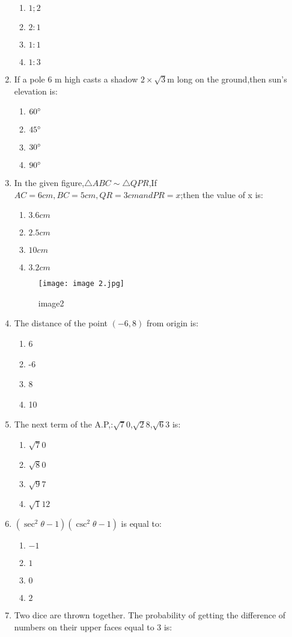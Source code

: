 \documentclass{article}
\begin{document}
\begin{enumerate}
	\begin{enumerate}
	\item $1;2$
	\item $2:1$
	\item $1:1$
	\item $1:3$
\end{enumerate}
\item If a pole 6 m high casts a shadow $2 \times \sqrt{3}$m long on the ground,then sun's elevation is:
	\begin{enumerate}
	\item $60\degree$
	\item $45\degree$
	\item $30\degree$
	\item $90\degree$
	\end{enumerate}
\item In the given figure,$\triangle ABC \sim \triangle QPR$,If $AC = 6 cm,BC = 5 cm,QR = 3 cm and PR = x$;then the value of  x is:
	\begin{enumerate}
	\item $3.6 cm$
	\item $2.5 cm$
	\item $10 cm$
	\item $3.2 cm$
	\end{enumerate}
	\begin{figure}[!ht]
\centering
\texttt{[image: image 2.jpg]}
\label{fig:image1}
	\caption{image2}
\end{figure}
\item The distance of the point $(-6,8)$ from origin is:
	\begin{enumerate}
	\item 6
	\item -6
	\item 8
	\item 10
\end{enumerate}
\item The next term of the A.P,:$\sqrt 70$,$\sqrt 28$,$\sqrt 63$ is:
	\begin{enumerate}
        \item $\sqrt 70$
	\item $\sqrt 80$
	\item $\sqrt 97$
	\item $\sqrt 112$
\end{enumerate}
\item $(\sec^2 \theta - 1)(\csc^2 \theta - 1)$
is equal to:
\begin{enumerate}
	\item $-1$
	\item $1$
	\item $0$
	\item $2$
\end{enumerate}
\item  Two dice are thrown together. The probability of getting the difference of numbers on their upper faces equal to 3 is:


\end{enumerate}
\end{document}
